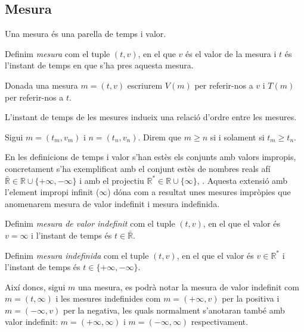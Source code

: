 \subsection{Mesura}\label{sec:model:mesura} 

Una mesura és una parella de temps i valor.

\begin{definition}[Mesura]
  \label{def:model:mesura}
  Definim \emph{mesura} com el tuple $(t,v)$, en el que $v$ és el
  valor de la mesura i $t$ és l'instant de temps en que s'ha pres
  aquesta mesura.
\end{definition}


Donada una mesura $m=(t,v)$ escriurem $V(m)$ per referir-nos a $v$ i
$T(m)$ per referir-nos a $t$.

L'instant de temps de les mesures indueix una relació d'ordre entre
les mesures.
\begin{definition}
  \label{def:model:mesura-relacio-ordre}
  Sigui $m=(t_m,v_m)$ i $n=(t_n,v_n)$. Direm que $m\geq n$ si i solament
  si $t_m\geq t_n$.
\end{definition}


En les definicions de temps i valor s'han estès els conjunts amb
valors impropis, concretament s'ha exemplificat amb el conjunt estès
de nombres reals afí $\bar{\mathbb{R}} \in \mathbb{R} \cup
\{+\infty,-\infty\}$ i amb el projectiu $\mathbb{R}^*\in\mathbb{R}
\cup\{\infty\}$,
\parencite{cantrell:extendedreal,cantrell:projectivelyextendedreal}. Aquesta
extensió amb l'element impropi infinit ($\infty$) dóna com a resultat
unes mesures impròpies que anomenarem mesura de valor indefinit i
mesura indefinida.

\begin{definition}
  \label{def:model:mesura_valor_indefinit}
  Definim \emph{mesura de valor indefinit} com el tuple $(t,v)$, en el
  que el valor és $v=\infty$ i l'instant de temps és
  $t\in\bar{\mathbb{R}}$.
\end{definition}

\begin{definition}
  \label{def:model:mesura_indefinida}
  Definim \emph{mesura indefinida} com el tuple $(t,v)$, en el que el
  valor és $v\in\mathbb{R}^*$ i l'instant de temps és
  $t\in\{+\infty,-\infty\}$.
\end{definition}

Així doncs, sigui $m$ una mesura, es podrà notar la mesura de valor
indefinit com $m=(t,\infty)$ i les mesures indefinides com
$m=(+\infty,v)$ per la positiva i $m=(-\infty,v)$ per la negativa, les
quals normalment s'anotaran també amb valor indefinit:
$m=(+\infty,\infty)$ i $m=(-\infty,\infty)$ respectivament.


